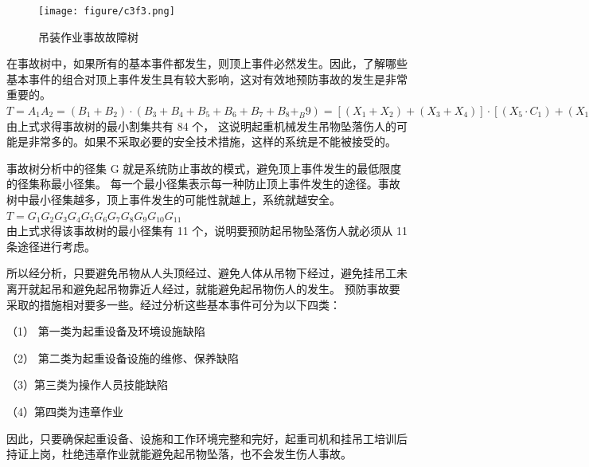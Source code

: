 \begin{landscape}
\begin{figure}[thbp!]
    \centering
    \texttt{[image: figure/c3f3.png]}
    \caption{吊装作业事故故障树}
    \label{fig:c3f3}
\end{figure}
\end{landscape}

在事故树中，如果所有的基本事件都发生，则顶上事件必然发生。因此，了解哪些基本事件的组合对顶上事件发生具有较大影响，这对有效地预防事故的发生是非常重要的。\\

$T=A_1A_2=(B_1+B_2)·(B_3+B_4+B_5+B_6+B_7+B_8+_B9)=[(X_1+X_2)+(X_3+X_4)]·[(X_5·C_1)+(X_{15}+C_2)+(X_{18}+X_{19})+(X_{20}+X_{21}+C_3)+(X_{24}·X_{25})+(X_{26}+X_{27})+(X_{28}+X_{29})]
=(X_1+X_2+X_3+X_4)·[X_5·(D_1+D_2+D_3)+X_{15}+(X_{16}+X_{17})+(X_{18}+X_{19})+X_{20}+X_{21}+
(X_{22}+X_{23})+X_{24}·X_{25}+X_{26}+X_{27}+X_{28}+X_{29}]
=(X_1+X_2+X_3+X_4)·[X_3·(X_6+X_7+X_8+X_9+X_{10}+X_{11}+X_{12}+X_{13}·X_{14}+X_{15}+X_{16}+X_{17}+X_{18}+X_{19}
+X_{20}+X_{21}+X_{22}+X_{23}+X_{24}+X_{25}+X_{26}+X_{27}+X_{28})]$\\

由上式求得事故树的最小割集共有 84 个，
这说明起重机械发生吊物坠落伤人的可能是非常多的。如果不采取必要的安全技术措施，这样的系统是不能被接受的。

事故树分析中的径集 G 就是系统防止事故的模式，避免顶上事件发生的最低限度的径集称最小径集。
每一个最小径集表示每一种防止顶上事件发生的途径。事故树中最小径集越多，顶上事件发生的可能性就越上，系统就越安全。\\

$T=G_1G_2G_3G_4G_5G_6G_7G_8G_9G_{10}G_{11}$\\

由上式求得该事故树的最小径集有 11 个，说明要预防起吊物坠落伤人就必须从 11 条途径进行考虑。

所以经分析，只要避免吊物从人头顶经过、避免人体从吊物下经过，避免挂吊工未离开就起吊和避免起吊物靠近人经过，就能避免起吊物伤人的发生。
预防事故要采取的措施相对要多一些。经过分析这些基本事件可分为以下四类：

（1） 第一类为起重设备及环境设施缺陷

（2） 第二类为起重设备设施的维修、保养缺陷

（3）第三类为操作人员技能缺陷

（4）第四类为违章作业

因此，只要确保起重设备、设施和工作环境完整和完好，起重司机和挂吊工培训后持证上岗，杜绝违章作业就能避免起吊物坠落，也不会发生伤人事故。


